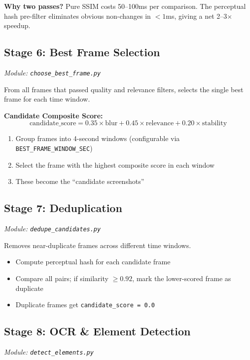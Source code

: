 \documentclass[12pt, a4paper]{article}
\newcommand{\codeinline}[1]{\texttt{\small\colorbox{codebg}{#1}}}
\newcommand{\filepath}[1]{\texttt{\small #1}}
\begin{document}
\textbf{Why two passes?} Pure SSIM costs 50--100ms per comparison. The perceptual hash pre-filter eliminates obvious non-changes in $< 1$ms, giving a net 2--3$\times$ speedup.

\subsection{Stage 6: Best Frame Selection}
\textit{Module: \filepath{choose\_best\_frame.py}}

From all frames that passed quality and relevance filters, selects the single best frame for each time window.

\textbf{Candidate Composite Score:}
\begin{equation}
    \text{candidate\_score} = 0.35 \times \text{blur} + 0.45 \times \text{relevance} + 0.20 \times \text{stability}
\end{equation}

\begin{enumerate}
    \item Group frames into 4-second windows (configurable via \codeinline{BEST\_FRAME\_WINDOW\_SEC})
    \item Select the frame with the highest composite score in each window
    \item These become the ``candidate screenshots''
\end{enumerate}

\subsection{Stage 7: Deduplication}
\textit{Module: \filepath{dedupe\_candidates.py}}

Removes near-duplicate frames across different time windows.

\begin{itemize}
    \item Compute perceptual hash for each candidate frame
    \item Compare all pairs; if similarity $\geq 0.92$, mark the lower-scored frame as duplicate
    \item Duplicate frames get \codeinline{candidate\_score = 0.0}
\end{itemize}

\subsection{Stage 8: OCR \& Element Detection}
\textit{Module: \filepath{detect\_elements.py}}
\end{document}
